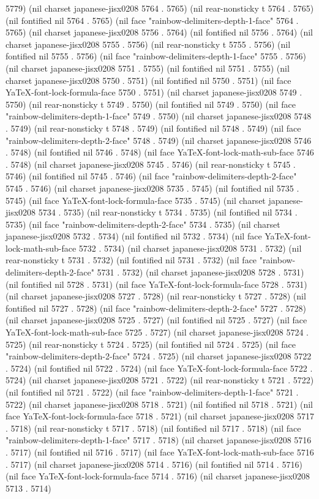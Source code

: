 5779) (nil charset japanese-jisx0208 5764 . 5765) (nil rear-nonsticky t 5764 . 5765) (nil fontified nil 5764 . 5765) (nil face "rainbow-delimiters-depth-1-face" 5764 . 5765) (nil charset japanese-jisx0208 5756 . 5764) (nil fontified nil 5756 . 5764) (nil charset japanese-jisx0208 5755 . 5756) (nil rear-nonsticky t 5755 . 5756) (nil fontified nil 5755 . 5756) (nil face "rainbow-delimiters-depth-1-face" 5755 . 5756) (nil charset japanese-jisx0208 5751 . 5755) (nil fontified nil 5751 . 5755) (nil charset japanese-jisx0208 5750 . 5751) (nil fontified nil 5750 . 5751) (nil face YaTeX-font-lock-formula-face 5750 . 5751) (nil charset japanese-jisx0208 5749 . 5750) (nil rear-nonsticky t 5749 . 5750) (nil fontified nil 5749 . 5750) (nil face "rainbow-delimiters-depth-1-face" 5749 . 5750) (nil charset japanese-jisx0208 5748 . 5749) (nil rear-nonsticky t 5748 . 5749) (nil fontified nil 5748 . 5749) (nil face "rainbow-delimiters-depth-2-face" 5748 . 5749) (nil charset japanese-jisx0208 5746 . 5748) (nil fontified nil 5746 . 5748) (nil face YaTeX-font-lock-math-sub-face 5746 . 5748) (nil charset japanese-jisx0208 5745 . 5746) (nil rear-nonsticky t 5745 . 5746) (nil fontified nil 5745 . 5746) (nil face "rainbow-delimiters-depth-2-face" 5745 . 5746) (nil charset japanese-jisx0208 5735 . 5745) (nil fontified nil 5735 . 5745) (nil face YaTeX-font-lock-formula-face 5735 . 5745) (nil charset japanese-jisx0208 5734 . 5735) (nil rear-nonsticky t 5734 . 5735) (nil fontified nil 5734 . 5735) (nil face "rainbow-delimiters-depth-2-face" 5734 . 5735) (nil charset japanese-jisx0208 5732 . 5734) (nil fontified nil 5732 . 5734) (nil face YaTeX-font-lock-math-sub-face 5732 . 5734) (nil charset japanese-jisx0208 5731 . 5732) (nil rear-nonsticky t 5731 . 5732) (nil fontified nil 5731 . 5732) (nil face "rainbow-delimiters-depth-2-face" 5731 . 5732) (nil charset japanese-jisx0208 5728 . 5731) (nil fontified nil 5728 . 5731) (nil face YaTeX-font-lock-formula-face 5728 . 5731) (nil charset japanese-jisx0208 5727 . 5728) (nil rear-nonsticky t 5727 . 5728) (nil fontified nil 5727 . 5728) (nil face "rainbow-delimiters-depth-2-face" 5727 . 5728) (nil charset japanese-jisx0208 5725 . 5727) (nil fontified nil 5725 . 5727) (nil face YaTeX-font-lock-math-sub-face 5725 . 5727) (nil charset japanese-jisx0208 5724 . 5725) (nil rear-nonsticky t 5724 . 5725) (nil fontified nil 5724 . 5725) (nil face "rainbow-delimiters-depth-2-face" 5724 . 5725) (nil charset japanese-jisx0208 5722 . 5724) (nil fontified nil 5722 . 5724) (nil face YaTeX-font-lock-formula-face 5722 . 5724) (nil charset japanese-jisx0208 5721 . 5722) (nil rear-nonsticky t 5721 . 5722) (nil fontified nil 5721 . 5722) (nil face "rainbow-delimiters-depth-1-face" 5721 . 5722) (nil charset japanese-jisx0208 5718 . 5721) (nil fontified nil 5718 . 5721) (nil face YaTeX-font-lock-formula-face 5718 . 5721) (nil charset japanese-jisx0208 5717 . 5718) (nil rear-nonsticky t 5717 . 5718) (nil fontified nil 5717 . 5718) (nil face "rainbow-delimiters-depth-1-face" 5717 . 5718) (nil charset japanese-jisx0208 5716 . 5717) (nil fontified nil 5716 . 5717) (nil face YaTeX-font-lock-math-sub-face 5716 . 5717) (nil charset japanese-jisx0208 5714 . 5716) (nil fontified nil 5714 . 5716) (nil face YaTeX-font-lock-formula-face 5714 . 5716) (nil charset japanese-jisx0208 5713 . 5714) 